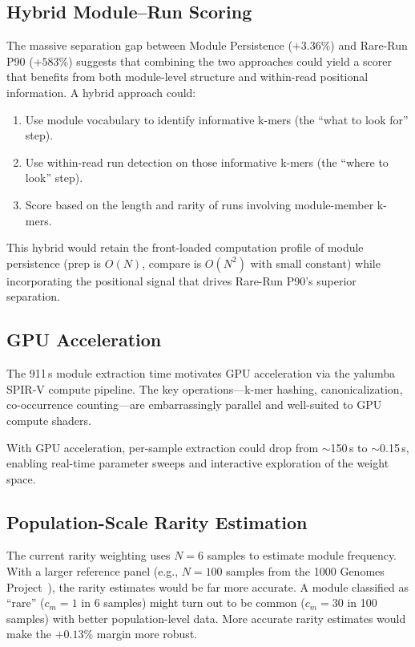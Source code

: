 \documentclass{../yalumba}
\begin{document}
\subsection{Hybrid Module--Run Scoring}

The massive separation gap between Module Persistence ($+3.36\%$) and
Rare-Run P90 ($+583\%$) suggests that combining the two approaches could
yield a scorer that benefits from both module-level structure and within-read
positional information.  A hybrid approach could:

\begin{enumerate}
  \item Use module vocabulary to identify informative k-mers (the ``what to
        look for'' step).
  \item Use within-read run detection on those informative k-mers (the
        ``where to look'' step).
  \item Score based on the length and rarity of runs involving module-member
        k-mers.
\end{enumerate}

This hybrid would retain the front-loaded computation profile of module
persistence (prep is $O(N)$, compare is $O(N^2)$ with small constant) while
incorporating the positional signal that drives Rare-Run P90's superior
separation.

\subsection{GPU Acceleration}

The 911\,s module extraction time motivates GPU acceleration via the yalumba
SPIR-V compute pipeline.  The key operations---k-mer hashing,
canonicalization, co-occurrence counting---are embarrassingly parallel and
well-suited to GPU compute shaders.


With GPU acceleration, per-sample extraction could drop from $\sim$150\,s to
$\sim$0.15\,s, enabling real-time parameter sweeps and interactive exploration
of the weight space.

\subsection{Population-Scale Rarity Estimation}

The current rarity weighting uses $N = 6$ samples to estimate module
frequency.  With a larger reference panel (e.g., $N = 100$ samples from the
1000 Genomes Project~\cite{1000genomes2015}), the rarity estimates would be
far more accurate.  A module classified as ``rare'' ($c_m = 1$ in 6 samples)
might turn out to be common ($c_m = 30$ in 100 samples) with better
population-level data.  More accurate rarity estimates would make the
$+0.13\%$ margin more robust.
\end{document}
